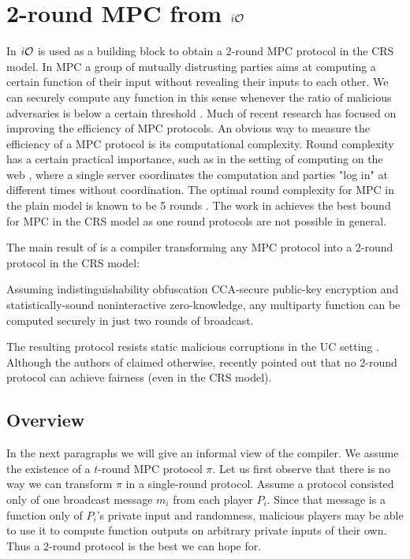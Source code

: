 \section{2-round MPC from $i\mathcal{O}$}
\label{sec:iO-mpc}

In \cite{MPC-iO} $i\mathcal{O}$ is used as a building block to obtain a 2-round MPC protocol in the CRS model. In MPC a group of mutually distrusting parties aims at computing a certain function of their input without revealing their inputs to each other. We can securely compute any function in this sense whenever the ratio of malicious adversaries is below a certain threshold \cite{yao1982protocols,goldreich1987play}.
Much of recent research has focused on improving the efficiency of MPC protocols. An obvious way to measure the efficiency of a MPC protocol is its computational complexity. Round complexity has a certain practical importance, such as in the setting of computing on the web \cite{halevi2011secure}, 
where a single server coordinates the computation and parties "log in" at different times without coordination.
The optimal round complexity for MPC in the plain model is known to be 5 rounds \cite{katz2004round}. The work in \cite{MPC-iO} achieves the best bound for MPC in the CRS model as one round protocols are not possible in general.

The main result of \cite{MPC-iO} is a compiler transforming any MPC protocol into a 2-round protocol in the CRS model: %
\begin{myinformaltheorem}
	Assuming indistinguishability obfuscation CCA-secure public-key encryption and statistically-sound noninteractive zero-knowledge, any multiparty function can be computed securely in just two rounds of broadcast.
\end{myinformaltheorem}


The resulting protocol resists static malicious corruptions in the UC setting \cite{canetti2001universally}.
Although the authors of \cite{MPC-iO} claimed otherwise, \cite{gordon2015constant} recently pointed out that no 2-round protocol can achieve fairness (even in the CRS model).

\subsection{Overview}
In the next paragraphs we will give an informal view of the compiler.
We assume the existence of a $t$-round MPC protocol $\pi$. %
Let us first observe  that there is no way we can transform $\pi$ in a single-round protocol. Assume a protocol consisted only of one broadcast message $m_i$ from each player $P_i$. Since that message is a function only of $P_i$'s private input and randomness, malicious players may be able to use it to compute function outputs on arbitrary private inputs of their own. Thus a 2-round protocol is the best we can hope for.

